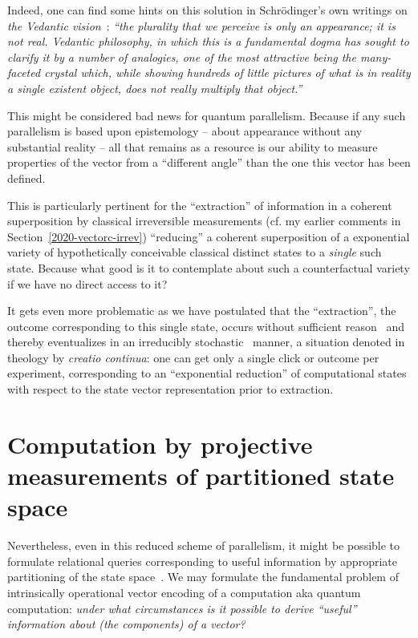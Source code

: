 \documentclass{ws-procs9x6}
\begin{document}
Indeed, one can find some hints on this solution in Schr\"odinger's own writings on {\it the Vedantic vision}~\cite[chapter~V]{book:1170675}:
\emph{``the plurality that we perceive is only \emph{an appearance; it is not real.}
Vedantic philosophy, in which this is a
fundamental dogma has sought to clarify it by a number of
analogies, one of the most attractive being the many-faceted crystal which, while showing hundreds of little
pictures of what is in reality a single existent object, does
not really multiply that object.''
}

This might be considered bad news for quantum parallelism.
Because if any such parallelism is based upon epistemology
-- about appearance without any substantial reality --
all that remains as a resource is our ability to measure properties of the vector
from a ``different angle'' than the one this vector has been defined.

This is particularly pertinent for the ``extraction'' of information in a coherent superposition
by classical irreversible measurements
(cf. my earlier comments in Section~\ref{2020-vectorc-irrev})
``reducing'' a coherent superposition of a exponential variety of hypothetically conceivable classical distinct states
to a \emph{single} such state.
Because what good is it to contemplate about such a counterfactual variety if we have no direct access to it?

It gets even more problematic as we have postulated that the ``extraction'',
the outcome corresponding to this single state, occurs without sufficient reason~\cite{sep-sufficient-reason} and
thereby eventualizes in an irreducibly stochastic~\cite{zeil-05_nature_ofQuantum} manner,
a situation denoted in theology by {\it creatio continua}:
one can get only a single click or outcome per experiment, corresponding to an ``exponential reduction'' of computational states with respect to the state vector representation
prior to extraction.

\section{Computation by projective measurements of partitioned state space}

Nevertheless, even in this reduced scheme of parallelism,
it might be possible to formulate relational queries corresponding to useful information
by appropriate partitioning of the state space~\cite{DonSvo01,svozil-2002-statepart-prl,svozil-2003-garda}.
We may formulate the fundamental problem of intrinsically operational vector encoding of a computation aka quantum computation:
\emph{under what circumstances is it possible to derive ``useful'' information about (the components) of a vector?}
\end{document}
